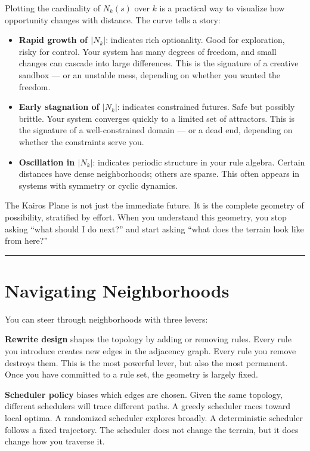 Plotting the cardinality of $N_k(s)$ over $k$ is a practical way to visualize how opportunity changes with distance. The curve tells a story:

\begin{itemize}
    \item \textbf{Rapid growth of $|N_k|$}: indicates rich optionality. Good for exploration, risky for control. Your system has many degrees of freedom, and small changes can cascade into large differences. This is the signature of a creative sandbox --- or an unstable mess, depending on whether you wanted the freedom.
    
    \item \textbf{Early stagnation of $|N_k|$}: indicates constrained futures. Safe but possibly brittle. Your system converges quickly to a limited set of attractors. This is the signature of a well-constrained domain --- or a dead end, depending on whether the constraints serve you.
    
    \item \textbf{Oscillation in $|N_k|$}: indicates periodic structure in your rule algebra. Certain distances have dense neighborhoods; others are sparse. This often appears in systems with symmetry or cyclic dynamics.
\end{itemize}

The Kairos Plane is not just the immediate future. It is the complete geometry of possibility, stratified by effort. When you understand this geometry, you stop asking ``what should I do next?'' and start asking ``what does the terrain look like from here?''

\begin{center}\rule{0.5\linewidth}{0.5pt}\end{center}

\section{Navigating Neighborhoods}
\label{7.5-navigating-neighborhoods}

You can steer through neighborhoods with three levers:

\textbf{Rewrite design} shapes the topology by adding or removing rules. Every rule you introduce creates new edges in the adjacency graph. Every rule you remove destroys them. This is the most powerful lever, but also the most permanent. Once you have committed to a rule set, the geometry is largely fixed.

\textbf{Scheduler policy} biases which edges are chosen. Given the same topology, different schedulers will trace different paths. A greedy scheduler races toward local optima. A randomized scheduler explores broadly. A deterministic scheduler follows a fixed trajectory. The scheduler does not change the terrain, but it does change how you traverse it.

